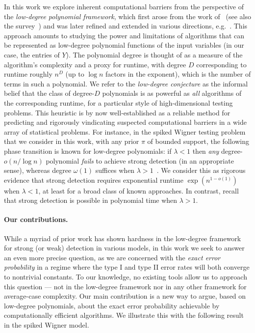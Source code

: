 \documentclass[11pt]{article}
\begin{document}
In this work we explore inherent computational barriers from the perspective of the \emph{low-degree polynomial framework}, which first arose from the work of~\cite{sos-clique,HS-bayesian,sos-detect,hopkins-thesis} (see also the survey~\cite{ld-notes}) and was later refined and extended in various directions, e.g.~\cite{SW-estimation,GJW-ld,planted-v-planted,coloring-clique}. This approach amounts to studying the power and limitations of algorithms that can be represented as low-degree polynomial functions of the input variables (in our case, the entries of $Y$). The polynomial degree is thought of as a measure of the algorithm's complexity and a proxy for runtime, with degree $D$ corresponding to runtime roughly $n^D$ (up to $\log n$ factors in the exponent), which is the number of terms in such a polynomial. We refer to the \emph{low-degree conjecture} as the informal belief that the class of degree-$D$ polynomials is as powerful as \emph{all} algorithms of the corresponding runtime, for a particular style of high-dimensional testing problems. This heuristic is by now well-established as a reliable method for predicting and rigorously vindicating suspected computational barriers in a wide array of statistical problems. For instance, in the spiked Wigner testing problem that we consider in this work, with any prior $\pi$ of bounded support, the following phase transition is known for low-degree polynomials: if $\lambda < 1$ then \emph{any} degree-$o(n/\log n)$ polynomial \emph{fails} to achieve strong detection (in an appropriate sense), whereas degree $\omega(1)$ suffices when $\lambda > 1$~\cite{ld-notes}. We consider this as rigorous evidence that strong detection requires exponential runtime $\exp(n^{1-o(1)})$ when $\lambda < 1$, at least for a broad class of known approaches. In contrast, recall that strong detection is possible in polynomial time when $\lambda > 1$.

\paragraph{Our contributions.} While a myriad of prior work has shown hardness in the low-degree framework for strong (or weak) detection in various models, in this work we seek to answer an even more precise question, as we are concerned with the \emph{exact error probability} in a regime where the type I and type II error rates will both converge to nontrivial constants. To our knowledge, no existing tools allow us to approach this question --- not in the low-degree framework nor in any other framework for average-case complexity. Our main contribution is a new way to argue, based on low-degree polynomials, about the exact error probability achievable by computationally efficient algorithms. We illustrate this with the following result in the spiked Wigner model.
\end{document}
